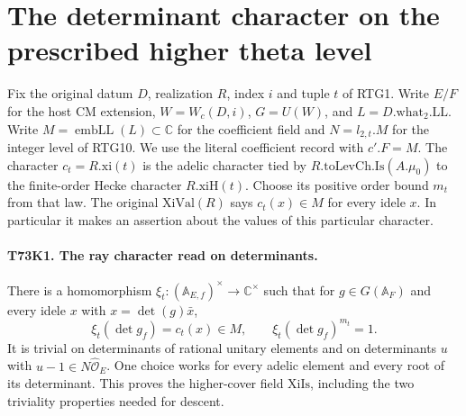 \section{The determinant character on the prescribed higher theta level}
\label{sec:prescribed-theta-determinant}

Fix the original datum $D$, realization $R$, index $i$ and tuple $t$
of RTG1. Write $E/F$ for the host CM extension, $W=W_c(D,i)$,
$G=U(W)$, and $L= D.\mathrm{what}_2.\mathrm{LL}$.
Write $M=\operatorname{embLL}(L)\subset\mathbb C$ for the coefficient
field and $N=l_{2,t}.M$ for the integer level of RTG10.
We use the literal coefficient record with $c'.F=M$. The character
$c_t=R.\mathrm{xi}(t)$ is the adelic character tied by
$R.\mathrm{toLevCh.Is}(A.\mu_0)$ to the finite-order Hecke character
$R.\mathrm{xiH}(t)$. Choose its positive order bound $m_t$ from that
law. The original $\mathrm{XiVal}(R)$ says $c_t(x)\in M$ for every
idele $x$. In particular it makes an assertion about the values
of this particular character.

\paragraph{T73K1. The ray character read on determinants.}
\label{claim:T73K1}
There is a homomorphism
$\xi_t:({\mathbb A}_{E,f})^\times\to\mathbb C^\times$
such that for $g\in G(\mathbb A_F)$ and every idele $x$ with
$x=\det(g)\bar x$,
\[
 \xi_t(\det g_f)=c_t(x)\in M,\qquad
 \xi_t(\det g_f)^{m_t}=1 .
 \tag{T73.1}
\]
It is trivial on determinants of rational unitary elements and on
determinants $u$ with $u-1\in N\widehat{\mathcal O}_E$.
One choice works for every adelic element and every root of its
determinant. This proves the higher-cover field $\mathrm{XiIs}$,
including the two triviality properties needed for descent.

